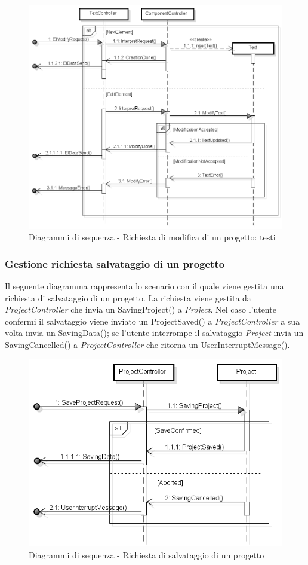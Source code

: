 	\begin{figure}[H]
		\centering
		\includegraphics[scale=0.5]{img/text.png}
		\caption{Diagrammi di sequenza - Richiesta di modifica di un progetto: testi}
	\end{figure}
	
	\subsubsection{Gestione richiesta salvataggio di un progetto}
	Il seguente diagramma rappresenta lo scenario con il quale viene gestita una richiesta di salvataggio di un progetto. La richiesta viene gestita da \textit{ProjectController} che invia un SavingProject() a \textit{Project}. Nel caso l'utente confermi il salvataggio viene inviato un ProjectSaved() a \textit{ProjectController} a sua volta invia un SavingData(); se l'utente interrompe il salvataggio \textit{Project} invia un SavingCancelled() a \textit{ProjectController} che ritorna un UserInterruptMessage().
	
	\begin{figure}[H]
		\centering
		\includegraphics[scale=0.5]{img/save.png}
		\caption{Diagrammi di sequenza - Richiesta di salvataggio di un progetto}
	\end{figure}
	\newpage
